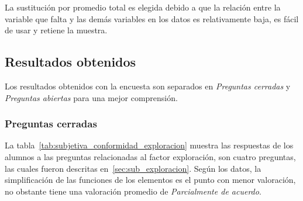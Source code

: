 La sustitución por promedio total es elegida debido a que la relación entre la
variable que falta y las demás variables en los datos es relativamente baja, es
fácil de usar y retiene la muestra. 



\subsection{Resultados obtenidos}
\label{sec:res_subjetiva}

Los resultados obtenidos con la encuesta son separados en \emph{Preguntas cerradas} y 
\emph{Preguntas abiertas} para una mejor comprensión.

\subsubsection{Preguntas cerradas}
La tabla~\ref{tab:subjetiva_conformidad_exploracion} muestra 
las respuestas de los alumnos a las preguntas relacionadas al factor
exploración, son cuatro preguntas, las cuales fueron descritas
en~\ref{sec:sub_exploracion}. Según los datos, la simplificación de las funciones 
de los elementos es el punto con menor valoración, no obstante tiene una valoración 
promedio de \emph{Parcialmente de acuerdo}.

